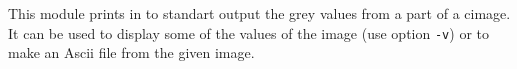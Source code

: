 This module prints in to standart output the grey values from a part of a cimage.
It can be used to display some of the values of the image (use option \verb+-v+) or to make an Ascii file from the given image.
